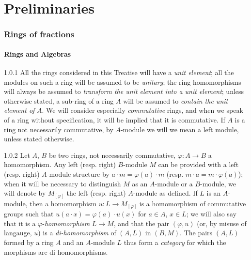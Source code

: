 \documentclass{book}
\begin{document}
\clearpage

\setcounter{part}{-1}

\part{Preliminaries}
\label{0-prelim}

\section{Rings of fractions}
\label{0-prelim-1}
\setcounter{subsection}{-1}

\subsection{Rings and Algebras}
\label{0-prelim-1.0}

\begin{env}{1.0.1}
\label{env-0.1.0.1}
All the rings considered in this Treatise will have a \emph{unit element}; all the modules
on such a ring will be assumed to be \emph{unitary}; the ring homomorphisms will always be
assumed to \emph{transform the unit element into a unit element}; unless otherwise stated,
a sub-ring of a ring $A$ will be assumed to \emph{contain the unit element of} $A$. We will
consider especially \emph{commutative} rings, and when we speak of a ring without
specification, it
will be implied that it is commutative. If $A$ is a ring not necessarily commutative, by
$A$-module we will we mean a left module, unless stated otherwise.
\end{env}

\begin{env}{1.0.2}
\label{env-0.1.0.2}
Let $A$, $B$ be two rings, not necessarily commutative, $\varphi\colon A\to B$ a homomorphism.
Any left (resp. right) $B$-module $M$ can be provided with a left (resp. right) $A$-module
structure by $a\cdot m=\varphi(a)\cdot m$ (resp. $m\cdot a=m\cdot\varphi(a)$); when it will
be necessary to distinguish $M$ as an $A$-module or a $B$-module, we will denote by
$M_{[\varphi]}$ the left (resp. right) $A$-module as defined. If $L$ is an $A$-module, then
a homomorphism $u\colon L\to M_{[\varphi]}$ is a homomorphism of commutative groups such that
$u(a\cdot x)=\varphi(a)\cdot u(x)$ for $a\in A$, $x\in L$; we will also say that it is a
$\varphi$-\emph{homomorphism} $L\to M$,
and that the pair $(\varphi,u)$ (or, by misuse of langauge, $u$)
is a \emph{di-homomorphism} of $(A,L)$ in $(B,M)$. The pairs $(A,L)$ formed by a ring $A$
and an $A$-module $L$ thus form a \emph{category} for which the morphisms are
di-homomorphisms.
\end{env}
\end{document}
